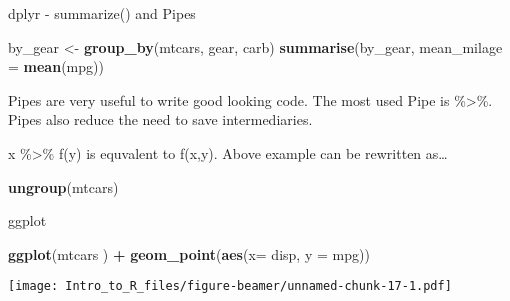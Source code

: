 \documentclass[ignorenonframetext,]{beamer}
\newenvironment{Shaded}{\begin{snugshade}}{\end{snugshade}}
\newcommand{\DataTypeTok}[1]{\textcolor[rgb]{0.13,0.29,0.53}{#1}}
\newcommand{\KeywordTok}[1]{\textcolor[rgb]{0.13,0.29,0.53}{\textbf{#1}}}
\newcommand{\NormalTok}[1]{#1}
\newcommand{\OperatorTok}[1]{\textcolor[rgb]{0.81,0.36,0.00}{\textbf{#1}}}
\newcommand{\StringTok}[1]{\textcolor[rgb]{0.31,0.60,0.02}{#1}}
\begin{document}
\begin{frame}[fragile]{dplyr - summarize() and Pipes}
\protect\hypertarget{dplyr---summarize-and-pipes}{}

\begin{Shaded}
\begin{Highlighting}[]
\NormalTok{by_gear <-}\StringTok{ }\KeywordTok{group_by}\NormalTok{(mtcars, gear, carb)}
\KeywordTok{summarise}\NormalTok{(by_gear, }\DataTypeTok{mean_milage =} \KeywordTok{mean}\NormalTok{(mpg))}
\end{Highlighting}
\end{Shaded}

Pipes are very useful to write good looking code. The most used Pipe is
\%\textgreater{}\%. Pipes also reduce the need to save intermediaries.

x \%\textgreater{}\% f(y) is equvalent to f(x,y). Above example can be
rewritten as\ldots{}

\begin{Shaded}
\end{Shaded}

\begin{Shaded}
\begin{Highlighting}[]
\KeywordTok{ungroup}\NormalTok{(mtcars)}
\end{Highlighting}
\end{Shaded}

\end{frame}

\begin{frame}[fragile]{ggplot}
\protect\hypertarget{ggplot}{}

\begin{Shaded}
\begin{Highlighting}[]
\KeywordTok{ggplot}\NormalTok{(mtcars ) }\OperatorTok{+}\StringTok{ }\KeywordTok{geom_point}\NormalTok{(}\KeywordTok{aes}\NormalTok{(}\DataTypeTok{x=}\NormalTok{ disp, }\DataTypeTok{y =}\NormalTok{ mpg))}
\end{Highlighting}
\end{Shaded}

\texttt{[image: Intro\_to\_R\_files/figure-beamer/unnamed-chunk-17-1.pdf]}

\end{frame}
\end{document}
